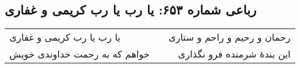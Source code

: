 \begin{center}
\section*{رباعی شماره ۶۵۳: یا رب یا رب کریمی و غفاری}
\label{sec:sh653}
\begin{longtable}{l p{0.5cm} r}
یا رب یا رب کریمی و غفاری
&&
رحمان و رحیم و راحم و ستاری
\\
خواهم که به رحمت خداوندی خویش
&&
این بندهٔ شرمنده فرو نگذاری
\\
\end{longtable}
\end{center}
